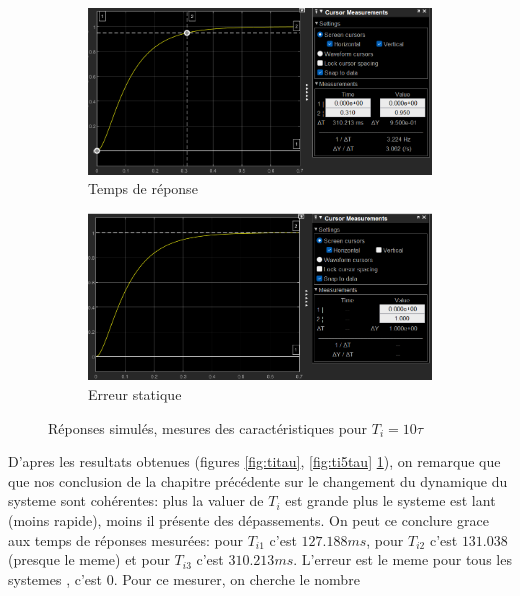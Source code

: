 \documentclass[12pt, a4paper]{report}
\begin{document}
\begin{figure}[H]
    \begin{subfigure}[h!]{0.46\linewidth}
        \includegraphics[width=\linewidth]{sim1t10tautr5prc.png}
        \caption{Temps de réponse}
    \end{subfigure}
    \hfill
    \begin{subfigure}[h!]{0.46\linewidth}
        \includegraphics[width=\linewidth]{sim1t10tauerrur.png}
        \caption{Erreur statique}
    \end{subfigure}
    \caption{Réponses simulés, mesures des caractéristiques pour $T_i = 10\tau$}
    \label{fig:ti10tau}
\end{figure}

D'apres les resultats obtenues (figures \ref{fig:titau}, \ref{fig:ti5tau} \ref{fig:ti10tau}), on remarque que 
que nos conclusion de la chapitre précédente sur le changement du dynamique du systeme sont cohérentes: plus la valuer de $T_i$ est grande plus le 
systeme est lant (moins rapide), moins il présente des dépassements. On peut ce conclure grace aux temps de réponses mesurées: pour $T_{i1}$ c'est $127.188 ms$, pour $T_{i2}$ c'est $131.038$ (presque le meme) et pour $T_{i3} $ c'est $310.213 ms$. L'erreur est le meme pour tous les systemes
, c'est 0. Pour ce mesurer, on cherche le nombre
\end{document}
